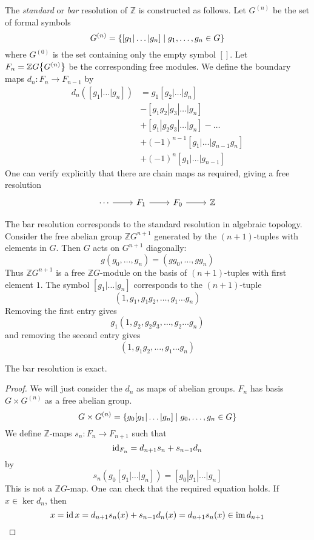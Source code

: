 \begin{definition}
    The \emph{standard} or \emph{bar} resolution of \( \mathbb Z \) is constructed as follows.
    Let \( G^{(n)} \) be the set of formal symbols
    \[ G^{(n)} = \qty{[g_1 | \dots | g_n] \mid g_1, \dots, g_n \in G} \]
    where \( G^{(0)} \) is the set containing only the empty symbol \( [] \).
    Let \( F_n = \mathbb Z G \qty{G^{(n)}} \) be the corresponding free modules.
    We define the boundary maps \( d_n : F_n \to F_{n-1} \) by
    \begin{align*}
        d_n([g_1 | \dots | g_n]) &= g_1[g_2 | \dots | g_n] \\
        &- [g_1 g_2 | g_3 | \dots | g_n] \\
        &+ [g_1 | g_2 g_3 | \dots | g_n] - \dots \\
        &+ (-1)^{n-1} [g_1 | \dots | g_{n-1} g_n] \\
        &+ (-1)^n [g_1 | \dots | g_{n-1}]
    \end{align*}
    One can verify explicitly that there are chain maps as required, giving a free resolution
\[\begin{tikzcd}
	\cdots & {F_1} & {F_0} & {\mathbb Z}
	\arrow[from=1-1, to=1-2]
	\arrow[from=1-2, to=1-3]
	\arrow[from=1-3, to=1-4]
\end{tikzcd}\]
\end{definition}
\begin{remark}
    The bar resolution corresponds to the standard resolution in algebraic topology.
    Consider the free abelian group \( \mathbb Z G^{n+1} \) generated by the \( (n + 1) \)-tuples with elements in \( G \).
    Then \( G \) acts on \( G^{n+1} \) diagonally:
    \[ g(g_0, \dots, g_n) = (gg_0, \dots, gg_n) \]
    Thus \( \mathbb Z G^{n+1} \) is a free \( \mathbb Z G \)-module on the basis of \( (n + 1) \)-tuples with first element \( 1 \).
    The symbol \( [g_1 | \dots | g_n] \) corresponds to the \( (n + 1) \)-tuple
    \[ (1, g_1, g_1 g_2, \dots, g_1 \dots g_n) \]
    Removing the first entry gives
    \[ g_1 (1, g_2, g_2 g_3, \dots, g_2 \dots g_n) \]
    and removing the second entry gives
    \[ (1, g_1 g_2, \dots, g_1 \dots g_n) \]
\end{remark}
\begin{lemma}
    The bar resolution is exact.
\end{lemma}
\begin{proof}
    We will just consider the \( d_n \) as maps of abelian groups.
    \( F_n \) has basis \( G \times G^{(n)} \) as a free abelian group.
    \[ G \times G^{(n)} = \qty{g_0 [g_1 | \dots | g_n] \mid g_0, \dots, g_n \in G} \]
    We define \( \mathbb Z \)-maps \( s_n : F_n \to F_{n+1} \) such that
    \[ \operatorname{id}_{F_n} = d_{n+1} s_n + s_{n-1} d_n \]
    by
    \[ s_n(g_0[g_1 | \dots | g_n]) = [g_0 | g_1 | \dots | g_n] \]
    This is not a \( \mathbb Z G \)-map.
    One can check that the required equation holds.
    If \( x \in \ker d_n \), then
    \[ x = \operatorname{id} x = d_{n+1} s_n(x) + s_{n-1} d_n(x) = d_{n+1} s_n(x) \in \operatorname{im} d_{n+1} \]
\end{proof}
